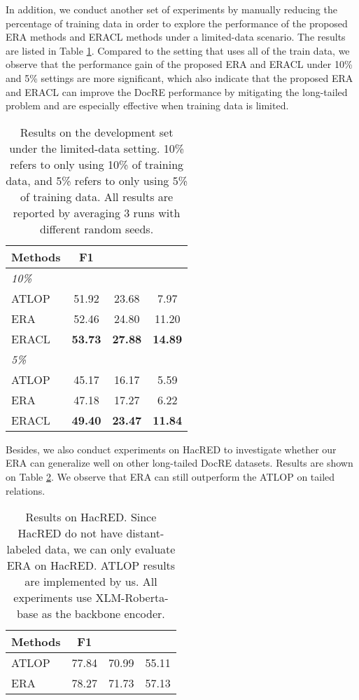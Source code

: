 \documentclass[11pt]{article}
\begin{document}
    In addition, we conduct another set of experiments by manually reducing the percentage of training data in order to explore the performance of the proposed ERA methods and ERACL methods under a limited-data scenario. The results are listed in Table \ref{tb:with-few-data}. Compared to the setting that uses all of the train data, we observe that the performance gain of the proposed ERA and ERACL under 10\% and 5\% settings are more significant, which also indicate that the proposed ERA and ERACL can improve the DocRE performance by mitigating the long-tailed problem and are especially effective when training data is limited.
    \begin{table}[!h]
        \centering
        \begin{tabular}{lccc}
            \toprule
            Methods & F1 &  & \\
            \midrule
            \textit{10\%} &  &  &     \\
            ATLOP &51.92   &23.68  &7.97  \\
            ERA    &52.46   &24.80  &11.20   \\
            ERACL    &\bf{53.73}   &\bf{27.88}  &\bf{14.89}   \\
            \hline
            \textit{5\%} &  &  &     \\
            ATLOP    &45.17   &16.17   &5.59    \\
            ERA     &47.18  &17.27    &6.22    \\
            ERACL     &\bf{49.40}   &\bf{23.47}   &\bf{11.84}    \\
            \toprule
        \end{tabular}
        \caption{Results on the development set under the limited-data setting. 10\% refers to only using 10\% of training data, and 5\% refers to only using 5\% of training data. All results are reported by averaging 3 runs with different random seeds.}
        \label{tb:with-few-data}
    \end{table}
    
    Besides, we also conduct experiments on HacRED to investigate whether our ERA can generalize well on other long-tailed DocRE datasets. Results are shown on Table \ref{tb:hacred-results}. We observe that ERA can still outperform the ATLOP on tailed relations.
    
     \begin{table}[!h]
        \centering
        \begin{tabular}{lccc}
            \toprule
            Methods & F1 &  & \\
            \midrule
            ATLOP &77.84   &70.99  &55.11  \\
            ERA    &78.27   &71.73  &57.13   \\
            \hline
            \toprule
        \end{tabular}
        \caption{Results on HacRED. Since HacRED do not have distant-labeled data, we can only evaluate ERA on HacRED. ATLOP results are implemented by us. All experiments use XLM-Roberta-base as the backbone encoder.}
        \label{tb:hacred-results}
    \end{table}
    
\end{document}
